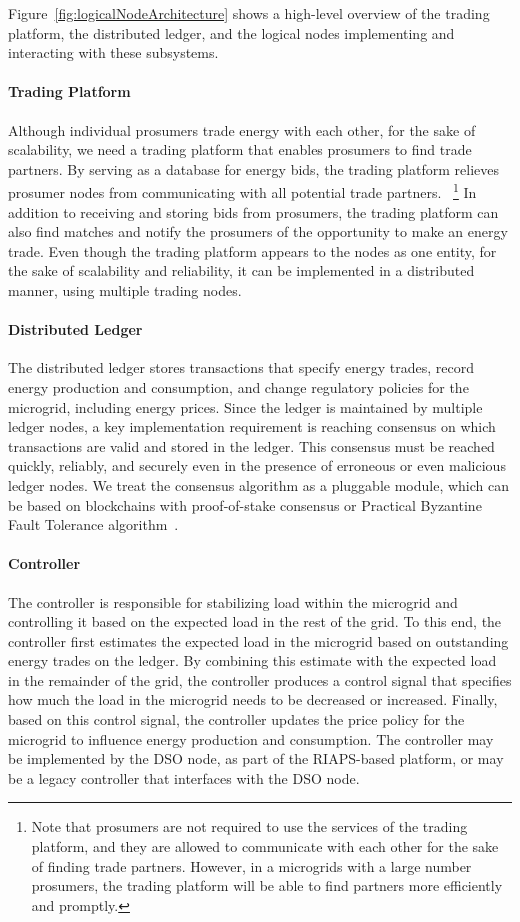 \documentclass[sigconf]{acmart}
\begin{document}
Figure~\ref{fig:logicalNodeArchitecture} shows a high-level overview of the trading platform, the distributed ledger, and the logical nodes implementing and interacting with these subsystems.

\paragraph{Trading Platform}
Although individual prosumers trade energy with each other, for the sake of scalability, we need a trading platform that enables prosumers to find trade partners.
By serving as a database for energy bids, the trading platform relieves prosumer nodes from communicating with all potential trade partners.~%
\footnote{Note that prosumers are not required to use the services of the trading platform, and they are allowed to communicate with each other for the sake of finding trade partners.
However, in a microgrids with a large number prosumers, the trading platform will be able to find partners more efficiently and promptly.}
In addition to receiving and storing bids from prosumers, the trading platform can also find matches and notify the prosumers of the opportunity to make an energy trade.
Even though the trading platform appears to the nodes as one entity, for the sake of scalability and reliability, it can be implemented in a distributed manner, using multiple trading nodes.

\paragraph{Distributed Ledger}
The distributed ledger stores transactions that specify energy trades, record energy production and consumption, and change regulatory policies for the microgrid, including energy prices.
Since the ledger is maintained by multiple ledger nodes, a key implementation requirement is reaching consensus on which transactions are valid and stored in the ledger.
This consensus must be reached quickly, reliably, and securely even in the presence of erroneous or even malicious ledger nodes.
We treat the consensus algorithm as a pluggable module, which can be based on blockchains with proof-of-stake consensus or Practical Byzantine Fault Tolerance algorithm~\cite{castro1999practical}.

\paragraph{Controller}
The controller is responsible for stabilizing load within the microgrid and controlling it based on the expected load in the rest of the grid.
To this end, the controller first estimates the expected load in the microgrid based on outstanding energy trades on the ledger.
By combining this estimate with the expected load in the remainder of the grid, the controller produces a control signal that specifies how much the load in the microgrid needs to be decreased or increased.
Finally, based on this control signal, the controller updates the price policy for the microgrid to influence energy production and consumption.
The controller may be implemented by the DSO node, as part of the RIAPS-based platform, or may be a legacy controller that interfaces with the DSO node.
\end{document}

